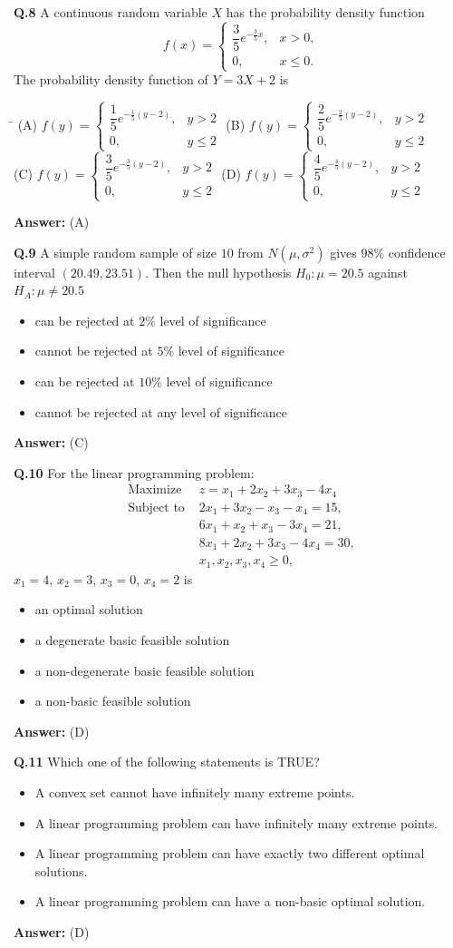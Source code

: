 \documentclass[11pt,a4paper]{article}
\newcommand{\optsfourA}[4]{%
  \begin{tabbing}
    \hspace{0.48\linewidth}\=\kill
    (A) #1 \> (B) #2 \\[2pt]
    (C) #3 \> (D) #4
  \end{tabbing}%
}
\newcommand{\optslistA}[4]{%
  \begin{itemize}
    \setlength{\itemsep}{2pt}\setlength{\parskip}{0pt}
    \item[(A)] #1
    \item[(B)] #2
    \item[(C)] #3
    \item[(D)] #4
  \end{itemize}%
}
\newcommand{\ans}[1]{\textbf{Answer:} #1\par\medskip}
\begin{document}
\textbf{Q.8} A continuous random variable $X$ has the probability density function
\[
  f(x) = \begin{cases} \dfrac{3}{5}e^{-\frac{3}{5}x}, & x > 0, \\ 0, & x \le 0. \end{cases}
\]
The probability density function of $Y = 3X + 2$ is
\optsfourA{$f(y) = \begin{cases} \dfrac{1}{5}e^{-\frac{1}{5}(y-2)}, & y > 2 \\ 0, & y \le 2 \end{cases}$}{$f(y) = \begin{cases} \dfrac{2}{5}e^{-\frac{2}{5}(y-2)}, & y > 2 \\ 0, & y \le 2 \end{cases}$}{$f(y) = \begin{cases} \dfrac{3}{5}e^{-\frac{3}{5}(y-2)}, & y > 2 \\ 0, & y \le 2 \end{cases}$}{$f(y) = \begin{cases} \dfrac{4}{5}e^{-\frac{4}{5}(y-2)}, & y > 2 \\ 0, & y \le 2 \end{cases}$}
\ans{(A)}

\textbf{Q.9} A simple random sample of size $10$ from $N(\mu, \sigma^2)$ gives $98\%$ confidence interval $(20.49, 23.51)$. Then the null hypothesis $H_0 : \mu = 20.5$ against $H_A : \mu \ne 20.5$
\optslistA{can be rejected at $2\%$ level of significance}{cannot be rejected at $5\%$ level of significance}{can be rejected at $10\%$ level of significance}{cannot be rejected at any level of significance}
\ans{(C)}

\textbf{Q.10} For the linear programming problem:
\begin{align*}
  \text{Maximize } & z = x_1 + 2x_2 + 3x_3 - 4x_4 \\
  \text{Subject to } & 2x_1 + 3x_2 - x_3 - x_4 = 15, \\
                     & 6x_1 + x_2 + x_3 - 3x_4 = 21, \\
                     & 8x_1 + 2x_2 + 3x_3 - 4x_4 = 30, \\
                     & x_1, x_2, x_3, x_4 \ge 0,
\end{align*}
$x_1 = 4$, $x_2 = 3$, $x_3 = 0$, $x_4 = 2$ is
\optslistA{an optimal solution}{a degenerate basic feasible solution}{a non-degenerate basic feasible solution}{a non-basic feasible solution}
\ans{(D)}

\textbf{Q.11} Which one of the following statements is TRUE?
\optslistA{A convex set cannot have infinitely many extreme points.}{A linear programming problem can have infinitely many extreme points.}{A linear programming problem can have exactly two different optimal solutions.}{A linear programming problem can have a non-basic optimal solution.}
\ans{(D)}
\end{document}
